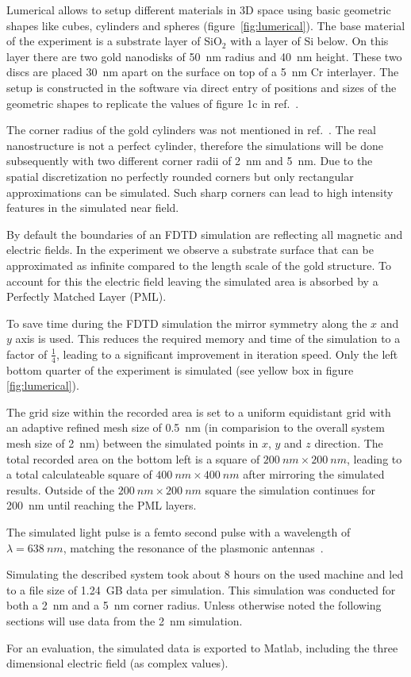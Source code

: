 Lumerical allows to setup different materials in 3D space using basic geometric shapes like cubes, cylinders and spheres (figure~\ref{fig:lumerical}). The base material of the experiment is a substrate layer of SiO$_2$ with a layer of Si below. On this layer there are two gold nanodisks of \SI{50}{nm} radius and \SI{40}{nm} height. These two discs are placed \SI{30}{nm} apart on the surface on top of a \SI{5}{nm} Cr interlayer. The setup is constructed in the software via direct entry of positions and sizes of the geometric shapes to replicate the values of figure 1c in ref.~\cite{heeg}.

The corner radius of the gold cylinders was not mentioned in ref.~\cite{heeg}. The real nanostructure is not a perfect cylinder, therefore the simulations will be done subsequently with two different corner radii of \SI{2}{nm} and \SI{5}{nm}. Due to the spatial discretization no perfectly rounded corners but only rectangular approximations can be simulated. Such sharp corners can lead to high intensity features in the simulated near field.

By default the boundaries of an FDTD simulation are reflecting all magnetic and electric fields. In the experiment we observe a substrate surface that can be approximated as infinite compared to the length scale of the gold structure. To account for this the electric field leaving the simulated area is absorbed by a Perfectly Matched Layer (PML).

To save time during the FDTD simulation the mirror symmetry along the $x$ and $y$ axis is used. This reduces the required memory and time of the simulation to a factor of $\frac{1}{4}$, leading to a significant improvement in iteration speed. Only the left bottom quarter of the experiment is simulated (see yellow box in figure \ref{fig:lumerical}).

The grid size within the recorded area is set to a uniform equidistant grid with an adaptive refined mesh size of \SI{0.5}{nm} (in comparision to the overall system mesh size of \SI{2}{nm}) between the simulated points in $x$, $y$ and $z$ direction. The total recorded area on the bottom left is a square of $\SI{200}{nm}\times\SI{200}{nm}$, leading to a total calculateable square of $\SI{400}{nm}\times\SI{400}{nm}$ after mirroring the simulated results. Outside of the $\SI{200}{nm}\times\SI{200}{nm}$ square the simulation continues for \SI{200}{nm} until reaching the PML layers.

The simulated light pulse is a femto second pulse with a wavelength of $\lambda=\SI{638}{nm}$, matching the resonance of the plasmonic antennas~\cite{heeg}.

Simulating the described system took about 8 hours on the used machine and led to a file size of \SI{1.24}{GB} data per simulation. This simulation was conducted for both a \SI{2}{nm} and a \SI{5}{nm} corner radius. Unless otherwise noted the following sections will use data from the \SI{2}{nm} simulation.

For an evaluation, the simulated data is exported to Matlab, including the three dimensional electric field (as complex values).
